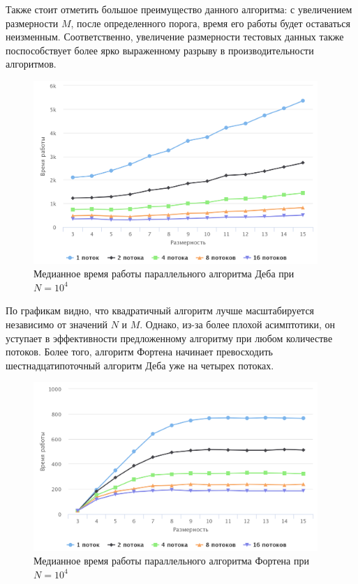 Также стоит отметить большое преимущество данного алгоритма: с увеличением размерности $M$, после определенного порога, время его работы будет оставаться неизменным.
Соответственно, увеличение размерности тестовых данных также поспособствует более ярко выраженному разрыву в производительности алгоритмов.

\begin{figure}[h!]
\centering
\includegraphics[width=0.96\textwidth]{images/deb10k.png}
\caption{Медианное время работы параллельного алгоритма Деба при $N=10^4$}
\end{figure}
По графикам видно, что квадратичный алгоритм лучше масштабируется независимо от значений $N$ и $M$. Однако, из-за более плохой асимптотики, он уступает в эффективности предложенному алгоритму при любом количестве потоков. Более того, алгоритм Фортена начинает превосходить шестнадцатипоточный алгоритм Деба уже на четырех потоках.

\begin{figure}[h!]
\centering
\includegraphics[width=0.96\textwidth]{images/10k.png}
\caption{Медианное время работы параллельного алгоритма Фортена при $N=10^4$}
\end{figure}
